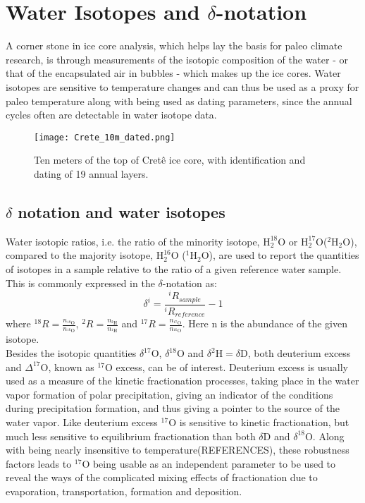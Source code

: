 \documentclass[../../CompleteThesis/Complete_1stDraft.tex]{subfiles}
\begin{document}
\section[Water Isotopes][Water Isotopes]{Water Isotopes and $\delta$-notation}
\label{Sec:Ice_WaterIsotopes}
A corner stone in ice core analysis, which helps lay the basis for paleo climate research, is through measurements of the isotopic composition of the water - or that of the encapsulated air in bubbles - which makes up the ice cores. Water isotopes are sensitive to temperature changes and can thus be used as a proxy for paleo temperature along with being used as dating parameters, since the annual cycles often are detectable in water isotope data.

\begin{figure}[h]
	\centering
	\texttt{[image: Crete\_10m\_dated.png]}
	\caption{Ten meters of the top of Cretê ice core, with identification and dating of 19 annual layers.}
	\label{Fig:ICE_Crete_10m_dated}
\end{figure}

\subsection[$\delta$ notation]{$\delta$ notation and water isotopes}
\label{Subsec:Ice_WaterIsotopes_deltaNotation}

Water isotopic ratios, i.e. the ratio of the minority isotope, ${\text{H}_2^{18}\text{O}}$ or ${\text{H}_2^{17}\text{O}}$($^2\text{H}_2\text{O}$), compared to the majority isotope, ${\text{H}_2^{16}\text{O}}$ ($^1\text{H}_2\text{O}$), are used to report the quantities of isotopes in a sample relative to the ratio of a given reference water sample. This is commonly expressed in the $\delta$-notation as:
\begin{equation}
	\delta^i = \frac{^iR_{sample}}{^iR_{reference}} - 1		
\end{equation}
where $^{18}R = \frac{n_{^{18}\text{O}}}{n_{^{16}\text{O}}}$, $^{2}R = \frac{n_{^{2}\text{H}}}{n_{^{1}\text{H}}}$  and $^{17}R = \frac{n_{^{17}\text{O}}}{n_{^{16}\text{O}}}$. Here n is the abundance of the given isotope.\\
Besides the isotopic quantities $\delta^{17}\text{O}$, $\delta^{18}\text{O}$ and $\delta^2\text{H} = \delta\text{D}$, both deuterium excess and $\Delta^{17}\text{O}$, known as $^{17}\text{O}$ excess, can be of interest. Deuterium excess is usually used as a measure of the kinetic fractionation processes, taking place in the water vapor formation of polar precipitation, giving an indicator of the conditions during precipitation formation, and thus giving a pointer to the source of the water vapor.
Like deuterium excess $^{17}\text{O}$ is sensitive to kinetic fractionation, but much less sensitive to equilibrium fractionation than both $\delta$D and $\delta^{18}$O. Along with being nearly insensitive to temperature(REFERENCES), these robustness factors leads to $^{17}$O being usable as an independent parameter to be used to reveal the ways of the complicated mixing effects of fractionation due to evaporation, transportation, formation and deposition.
\end{document}
